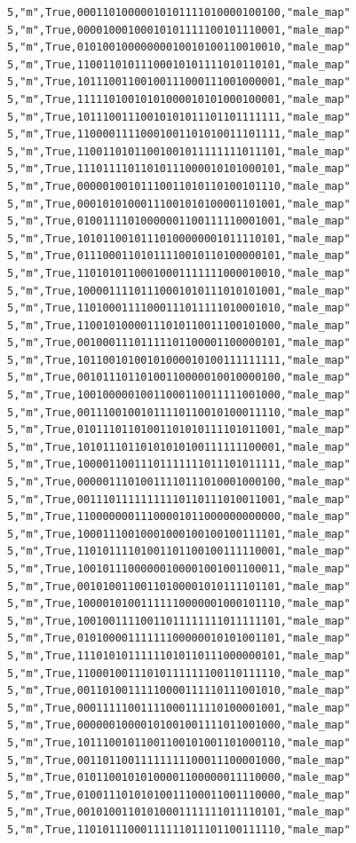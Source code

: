 \documentclass[authoryearcitations]{UoYCSproject}
\begin{document}
\begin{framed}
\begin{verbatim}
5,"m",True,00011010000010101111010000100100,"male_map"
5,"m",True,00001000100010101111100101110001,"male_map"
5,"m",True,01010010000000010010100110010010,"male_map"
5,"m",True,11001101011100010101111010110101,"male_map"
5,"m",True,10111001100100111000111001000001,"male_map"
5,"m",True,11111010010101000010101000100001,"male_map"
5,"m",True,10111001110010101011101101111111,"male_map"
5,"m",True,11000011110001001101010011101111,"male_map"
5,"m",True,11001101011001001011111111011101,"male_map"
5,"m",True,11101111011010111000010101000101,"male_map"
5,"m",True,00000100101110011010110100101110,"male_map"
5,"m",True,00010101000111001010100001101001,"male_map"
5,"m",True,01001111010000001100111110001001,"male_map"
5,"m",True,10101100101110100000001011110101,"male_map"
5,"m",True,01110001101011110010110100000101,"male_map"
5,"m",True,11010101100010001111111000010010,"male_map"
5,"m",True,10000111101110001010111010101001,"male_map"
5,"m",True,11010001111000111011111010001010,"male_map"
5,"m",True,11001010000111010110011100101000,"male_map"
5,"m",True,00100011101111101100001100000101,"male_map"
5,"m",True,10110010100101000010100111111111,"male_map"
5,"m",True,00101110110100110000010010000100,"male_map"
5,"m",True,10010000010011000110011111001000,"male_map"
5,"m",True,00111001001011110110010100011110,"male_map"
5,"m",True,01011101101001101010111101011001,"male_map"
5,"m",True,10101110110101010100111111100001,"male_map"
5,"m",True,10000110011101111111011101011111,"male_map"
5,"m",True,00000111010011110111010001000100,"male_map"
5,"m",True,00111011111111110110111010011001,"male_map"
5,"m",True,11000000011100001011000000000000,"male_map"
5,"m",True,10001110010001000100100100111101,"male_map"
5,"m",True,11010111101001101100100111110001,"male_map"
5,"m",True,10010111000000100001001001100011,"male_map"
5,"m",True,00101001100110100001010111101101,"male_map"
5,"m",True,10000101001111110000001000101110,"male_map"
5,"m",True,10010011110011011111111011111101,"male_map"
5,"m",True,01010000111111100000010101001101,"male_map"
5,"m",True,11101010111111010110111000000101,"male_map"
5,"m",True,11000100111010111111100110111110,"male_map"
5,"m",True,00110100111110000111110111001010,"male_map"
5,"m",True,00011111001111000111110100001001,"male_map"
5,"m",True,00000010000101001001111011001000,"male_map"
5,"m",True,10111001011001100101001101000110,"male_map"
5,"m",True,00110110011111111100011100001000,"male_map"
5,"m",True,01011001010100001100000011110000,"male_map"
5,"m",True,01001110101010011100011001110000,"male_map"
5,"m",True,00101001101010001111111011110101,"male_map"
5,"m",True,11010111000111111011101100111110,"male_map"

\end{verbatim}
\end{framed}
\end{document}
